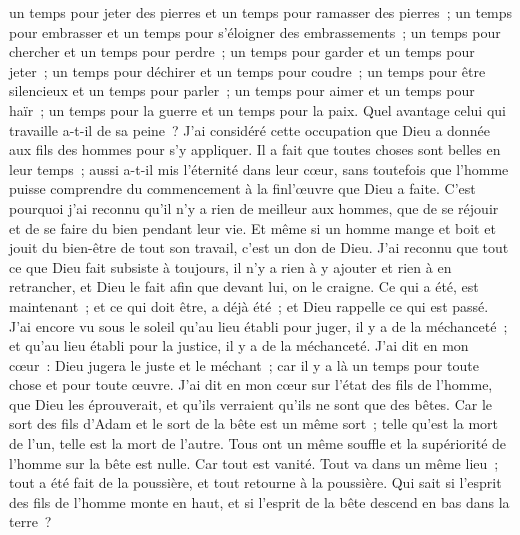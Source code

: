 \begin{multicols}{2}
un temps pour jeter des pierres et un temps pour ramasser des pierres~; un temps pour embrasser et un temps pour s'éloigner des embrassements~;
un temps pour chercher et un temps pour perdre~; un temps pour garder et un temps pour jeter~;
un temps pour déchirer et un temps pour coudre~; un temps pour être silencieux et un temps pour parler~;
un temps pour aimer et un temps pour haïr~; un temps pour la guerre et un temps pour la paix.
Quel avantage celui qui travaille a-t-il de sa peine~?
J'ai considéré cette occupation que Dieu a donnée aux fils des hommes pour s'y appliquer.
Il a fait que toutes choses sont belles en leur temps~; aussi a-t-il mis l'éternité dans leur cœur, sans toutefois que l'homme puisse comprendre du commencement à la finl'œuvre que Dieu a faite.
C'est pourquoi j'ai reconnu qu'il n'y a rien de meilleur aux hommes, que de se réjouir et de se faire du bien pendant leur vie.
Et même si un homme mange et boit et jouit du bien-être de tout son travail, c'est un don de Dieu.
J'ai reconnu que tout ce que Dieu fait subsiste à toujours, il n'y a rien à y ajouter et rien à en retrancher, et Dieu le fait afin que devant lui, on le craigne.
Ce qui a été, est maintenant~; et ce qui doit être, a déjà été~; et Dieu rappelle ce qui est passé.
J'ai encore vu sous le soleil qu'au lieu établi pour juger, il y a de la méchanceté~; et qu'au lieu établi pour la justice, il y a de la méchanceté.
J'ai dit en mon cœur~: Dieu jugera le juste et le méchant~; car il y a là un temps pour toute chose et pour toute œuvre.
J'ai dit en mon cœur sur l'état des fils de l'homme, que Dieu les éprouverait, et qu'ils verraient qu'ils ne sont que des bêtes.
Car le sort des fils d'Adam et le sort de la bête est un même sort~; telle qu'est la mort de l'un, telle est la mort de l'autre. Tous ont un même souffle et la supériorité de l'homme sur la bête est nulle. Car tout est vanité.
Tout va dans un même lieu~; tout a été fait de la poussière, et tout retourne à la poussière.
Qui sait si l'esprit des fils de l'homme monte en haut, et si l'esprit de la bête descend en bas dans la terre~?

\end{multicols}
